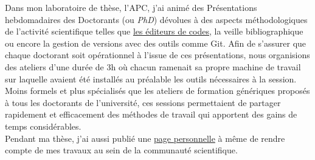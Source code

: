 \documentclass[paper=a4, fontsize=12pt,twoside]{scrartcl}
\begin{document}
\indent Dans mon laboratoire de th\`ese, l'APC, j'ai anim\'e des Pr\'esentations hebdomadaires des Doctorants (ou \textit{PhD}) d\'evolues \`a des aspects m\'ethodologiques de l'activit\'e scientifique telles que \href{https://phdiderot.wordpress.com/2015/10/30/presentation-hebdomadaire-des-doctorants-phd-atom-text-editor-workshop-oc-15/}{les \'editeurs de codes}, la veille bibliographique ou encore la gestion de versions avec des outils comme Git. Afin de s'assurer que chaque doctorant soit op\'erationnel \`a l'issue de ces pr\'esentations, nous organisions des ateliers d'une dur\'ee de 3h o\`u chacun ramenait sa propre machine de travail sur laquelle avaient \'et\'e install\'es au pr\'ealable les outils n\'ecessaires \`a la session. Moins formels et plus sp\'ecialis\'es que les ateliers de formation g\'en\'eriques propos\'es \`a tous les doctorants de l'universit\'e, ces sessions permettaient de partager rapidement et efficacement des m\'ethodes de travail qui apportent des gains de temps consid\'erables.\\

\indent Pendant ma th\`ese, j'ai aussi publi\'e une \href{http://homes.esat.kuleuven.be/~ileyk//index.html}{page personnelle} \`a m\^eme de rendre compte de mes travaux au sein de la communaut\'e scientifique.




\end{document}

